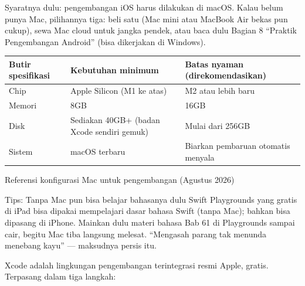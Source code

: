 


Syaratnya dulu: pengembangan iOS harus dilakukan di macOS. Kalau belum punya Mac, pilihannya tiga: beli satu (Mac mini atau MacBook Air bekas pun cukup), sewa Mac cloud untuk jangka pendek, atau baca dulu Bagian 8 “Praktik Pengembangan Android” (bisa dikerjakan di Windows).

\begin{center}
\begin{tabularx}{\linewidth}{|X|X|X|}
\hline
\textbf{Butir spesifikasi} & \textbf{Kebutuhan minimum} & \textbf{Batas nyaman (direkomendasikan)} \tabularnewline
\hline
Chip & Apple Silicon (M1 ke atas) & M2 atau lebih baru \tabularnewline
Memori & 8GB & 16GB \tabularnewline
Disk & Sediakan 40GB+ (badan Xcode sendiri gemuk) & Mulai dari 256GB \tabularnewline
Sistem & macOS terbaru & Biarkan pembaruan otomatis menyala \tabularnewline
\hline
\end{tabularx}
\end{center}

\begin{center}\small\color{gray}Referensi konfigurasi Mac untuk pengembangan (Agustus 2026)\end{center}

\begin{tcbinfo}{Tips: Tanpa Mac pun bisa belajar bahasanya dulu}
Swift Playgrounds yang gratis di iPad bisa dipakai mempelajari dasar bahasa Swift (tanpa Mac); bahkan bisa dipasang di iPhone. Mainkan dulu materi bahasa Bab 61 di Playgrounds sampai cair, begitu Mac tiba langsung melesat. “Mengasah parang tak menunda menebang kayu” — maksudnya persis itu.

\end{tcbinfo}


Xcode adalah lingkungan pengembangan terintegrasi resmi Apple, gratis. Terpasang dalam tiga langkah:

